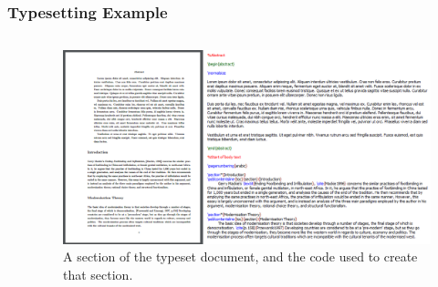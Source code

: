 \documentclass[aspectratio = 169]{beamer}
\begin{document}
\begin{frame}
\label{exampleI}
\frametitle{Typesetting Example}
\begin{columns}


\hyperlink{introI}{} \newline
\hyperlink{introII}{} \newline 
\hyperlink{scoping}{} \newline
\hyperlink{elaboration}{} \newline  
\hyperlink{software}{} \newline 
\hyperlink{toolchain}{} \newline 
\hyperlink{learning}{} \newline 
\hyperlink{problems}{} \newline 
\hyperlink{results}{} \newline
\hyperlink{exampleI}{} \newline 
\hyperlink{exampleII}{}  



\begin{figure}
\includegraphics[scale = 0.35]{example1}
\caption{A section of the typeset document, and the code used to create that section.}
\end{figure}

\end{columns}
\end{frame}



\end{document}
